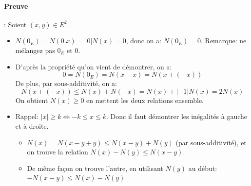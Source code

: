 \documentclass{article}
\begin{document}
\paragraph{Preuve}: Soient $(x, y) \in E^2$.
\begin{itemize}
 \item $N(0_{E}) = N(0.x) = |0| N(x) = 0$, donc on a: \underline{$N(0_E) = 0$}.
          \newline Remarque: ne mélangez pas $0_E$ et $0$.
 \item D'après la propriété qu'on vient de démontrer, on a:
          \[
          0 = N(0_{E}) = N(x-x) = N(x+(-x)) 
          \]
          De plus, par sous-additivité, on a: 
          \[
          N(x+(-x)) \leq N(x) + N(-x) = N(x) + |-1|N(x) = 2N(x)
          \]
          On obtient \underline{$N(x) \geq 0$} en mettent les deux relations ensemble.
 \item Rappel: $|x| \geq k \Longleftrightarrow -k \leq x \leq k$. 
          \newline Donc il faut démontrer les inégalités à gauche et à droite.
          \begin{itemize}
          \item $N(x) = N(x - y + y) \leq N(x - y) + N(y)$ (par sous-additivité), et on trouve la relation $N(x) - N(y) \leq N(x-y)$.
          \item De même fa\c con on trouve l'autre, en utilisant $N(y)$ au début: $-N(x-y) \leq N(x) - N(y)$
          \end{itemize}
          
 
 
\end{itemize}
\end{document}
